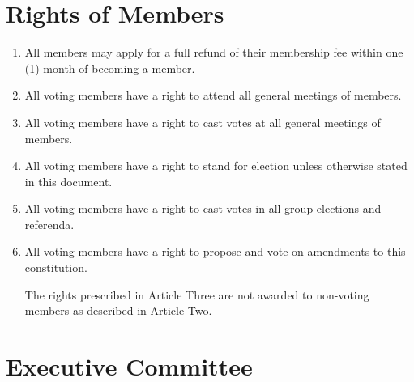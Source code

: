 \documentclass[12pt,a4paper]{article}
\begin{document}
\section{Rights of Members}

\begin{enumerate}
\item All members may apply for a full refund of their membership fee within one (1) month of becoming a member.

\item All voting members have a right to attend all general meetings of members.

\item All voting members have a right to cast votes at all general meetings of members.

\item All voting members have a right to stand for election unless otherwise stated in this document.

\item All voting members have a right to cast votes in all group elections and referenda.

\item All voting members have a right to propose and vote on amendments to this constitution.

The rights prescribed in Article Three are not awarded to non-voting members as described in Article Two.
\end{enumerate}

\section{Executive Committee}
\end{document}
